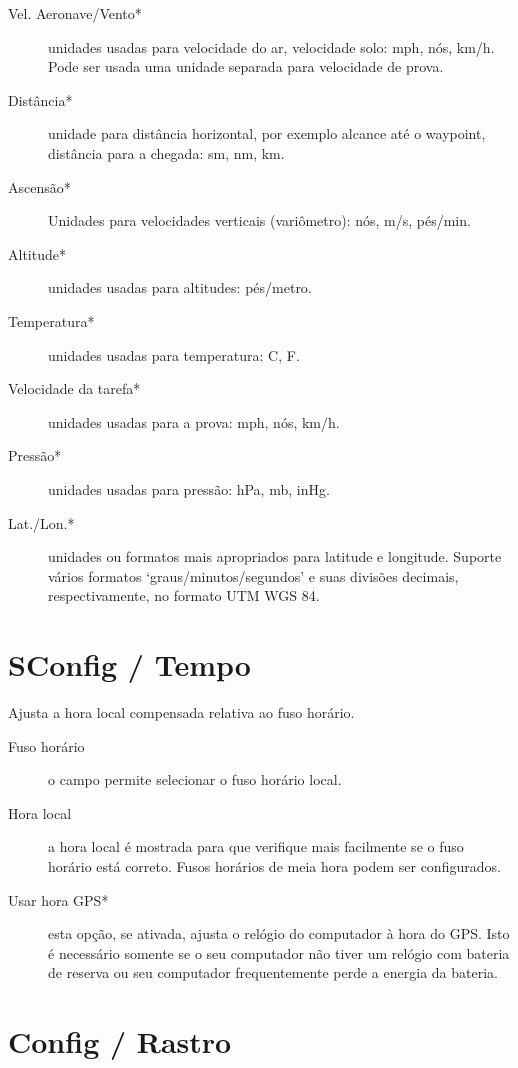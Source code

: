 \begin{description}
\item[Vel. Aeronave/Vento*]  unidades usadas para velocidade do ar, velocidade solo: mph, nós, km/h.  Pode ser usada uma unidade separada para velocidade de prova. 
\item[Distância*]  unidade para distância horizontal, por exemplo alcance até o waypoint, distância para a chegada: sm, nm, km.
\item[Ascensão*]  Unidades para velocidades verticais (variômetro): nós, m/s, pés/min. 
\item[Altitude*] unidades usadas para altitudes: pés/metro.
\item[Temperatura*]  unidades usadas para temperatura: \degree C, \degree F.
\item[Velocidade da tarefa*] unidades usadas para a prova: mph, nós, km/h.
\item[Pressão*]  unidades usadas para pressão: hPa,  mb, inHg.
\item[Lat./Lon.*] unidades ou formatos mais apropriados para latitude e longitude.  Suporte vários formatos ‘graus/minutos/segundos’ e suas divisões decimais, respectivamente, no formato UTM WGS 84.
\end{description}


\section{SConfig / Tempo}

Ajusta a hora local compensada relativa ao fuso horário.

\begin{description}
\item[Fuso horário]  o campo permite selecionar o fuso horário local.
\item[Hora local]  a hora local é mostrada para que verifique mais facilmente se o fuso horário está correto.  Fusos horários de meia hora podem ser configurados.
\item[Usar hora GPS*] esta opção, se ativada, ajusta o relógio do computador à hora do GPS.  Isto é necessário somente se o seu computador não tiver um relógio com bateria de reserva ou seu computador frequentemente perde a energia da bateria.
\end{description}


\section{Config / Rastro}

